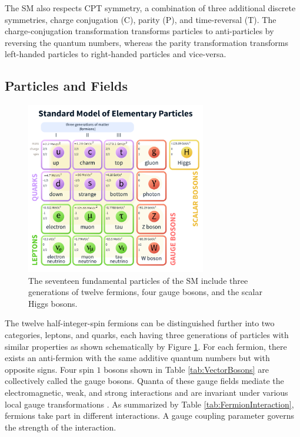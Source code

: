 The SM also respects CPT symmetry, a combination of three additional discrete symmetries, charge conjugation (C), parity (P), and time-reversal (T). The charge-conjugation transformation transforms particles to anti-particles by reversing the quantum numbers, whereas the parity transformation transforms left-handed particles to right-handed particles and vice-versa.

\subsection{Particles and Fields}
\label{subsec:Constituents}

\begin{figure}[H]
    \centering
    \includegraphics[width=0.7\textwidth] {figures/Theory/SMparticles.pdf}\hspace{1cm}
    \caption{ The seventeen fundamental particles of the SM include three generations of twelve fermions, four gauge bosons, and the scalar Higgs bosons. \cite{SMFigureWiki}}
    \label{fig:SM}
\end{figure}

The twelve half-integer-spin fermions can be distinguished further into two categories, leptons, and quarks, each having three generations of particles with similar properties as shown schematically by Figure \ref{fig:SM}. For each fermion, there exists an anti-fermion with the same additive quantum numbers but with opposite signs. Four spin $1$ bosons shown in Table \ref{tab:VectorBosons} are collectively called the gauge bosons. Quanta of these gauge fields mediate the electromagnetic, weak, and strong interactions and are invariant under various local gauge transformations \cite{Bernabeu2021}. As summarized by Table \ref{tab:FermionInteraction}, fermions take part in different interactions. A gauge coupling parameter governs the strength of the interaction.

